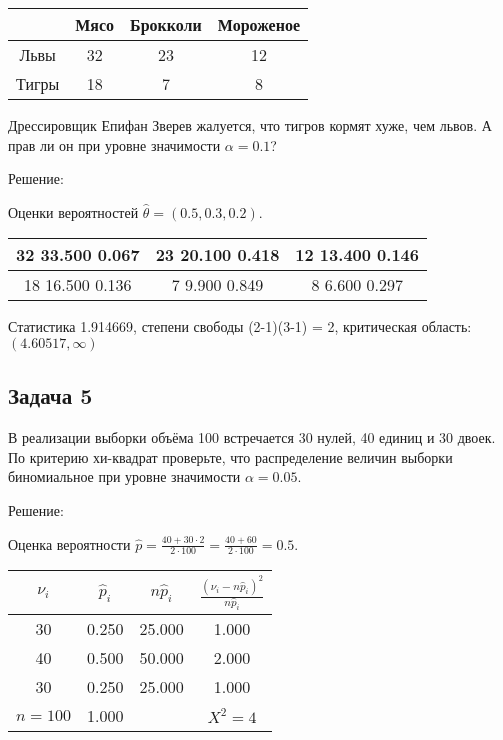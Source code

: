 \documentclass[a4paper,12pt]{article}
\begin{document}
\begin{tabular}{|c|c|c|c|}
    \hline
          & Мясо & Брокколи & Мороженое \\
    \hline
    Львы  & 32   & 23       & 12        \\
    \hline
    Тигры & 18   & 7        & 8         \\
    \hline
\end{tabular}

Дрессировщик Епифан Зверев жалуется, что тигров кормят хуже, чем львов. А прав ли он при уровне значимости $\alpha = 0.1$?

Решение:

Оценки вероятностей $\widehat{\theta} = (0.5, 0.3, 0.2)$.

\begin{tabular}{|c|c|c|}
    \hline
    32    33.500     0.067 & 23    20.100     0.418 & 12    13.400     0.146 \\
    \hline
    18    16.500     0.136 & 7     9.900     0.849  & 8     6.600     0.297  \\
    \hline
\end{tabular}

Статистика 1.914669, степени свободы (2-1)(3-1) = 2, критическая область: $(4.60517, \infty)$

\subsection*{Задача 5}

В реализации выборки объёма 100 встречается 30 нулей, 40 единиц и 30 двоек. По критерию хи-квадрат проверьте, что распределение величин выборки
биномиальное при уровне значимости $\alpha = 0.05$.

Решение:

Оценка вероятности $\widehat{p} = \frac{40 + 30 \cdot 2}{2 \cdot 100} = \frac{40 + 60}{2 \cdot 100} = 0.5$.

\begin{tabular}{|c|c|c|c|}
    \hline
    $\nu_i$   & $\widehat{p}_i$ & $n \widehat{p}_i$ & $\frac{(\nu_i - n \widehat{p}_i)^2}{n \widehat{p}_i}$ \\
    \hline
    30        & 0.250           & 25.000            & 1.000                                                 \\
    40        & 0.500           & 50.000            & 2.000                                                 \\
    30        & 0.250           & 25.000            & 1.000                                                 \\
    \hline
    $n = 100$ & 1.000           &                   & $X^2 = 4$                                             \\
    \hline
\end{tabular}
\end{document}
